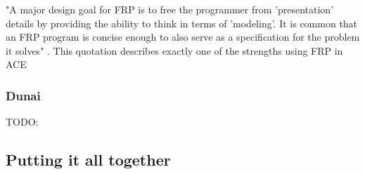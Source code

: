 "A major design goal for FRP is to free the programmer from 'presentation' details by providing the ability to think in terms of 'modeling'. It is common that an FRP program is concise enough to also serve as a specification for the problem it solves" \cite{Wan2000}. This quotation describes exactly one of the strengths using FRP in ACE \\

\subsubsection{Dunai}
TODO: \cite{perez_functional_2016}

\subsection{Putting it all together}